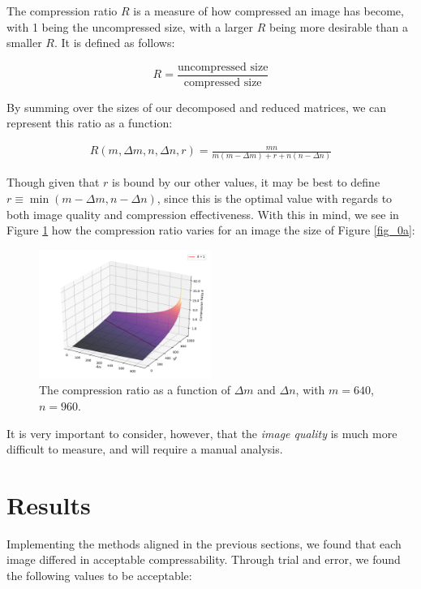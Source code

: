 \documentclass[a4paper,10pt,english]{article}
\begin{document}
\begin{multicols*}{2}
The compression ratio $R$ is a measure of how compressed an image has become, with 1 being the uncompressed size, with a larger $R$ being more desirable than a smaller $R$.  It is defined as follows:

\begin{equation*}
R = \frac{\text{uncompressed size}}{\text{compressed size}}
\end{equation*}

By summing over the sizes of our decomposed and reduced matrices, we can represent this ratio as a function:

\begin{align*}
R(m, \Delta m, n, \Delta n, r) = \frac{mn}{m(m - \Delta m) + r + n(n - \Delta n)}
\end{align*}

Though given that $r$ is bound by our other values, it may be best to define $r \equiv \min (m - \Delta m, n - \Delta n)$, since this is the optimal value with regards to both image quality and compression effectiveness.  With this in mind, we see in Figure \ref{fig_3} how the compression ratio varies for an image the size of Figure \ref{fig_0a}:

\begin{figure}[H]
 \centering
 \includegraphics[width = 0.5\textwidth, center]{../comp_ratio.pdf}
 \caption{The compression ratio as a function of $\Delta m$ and $\Delta n$, with $m = 640$, $n = 960$.\label{fig_3}}
\end{figure}

It is very important to consider, however, that the \textit{image quality} is much more difficult to measure, and will require a manual analysis.

\section*{Results}

Implementing the methods aligned in the previous sections, we found that each image differed in acceptable compressability.  Through trial and error, we found the following values to be acceptable:


\end{multicols*}
\end{document}

